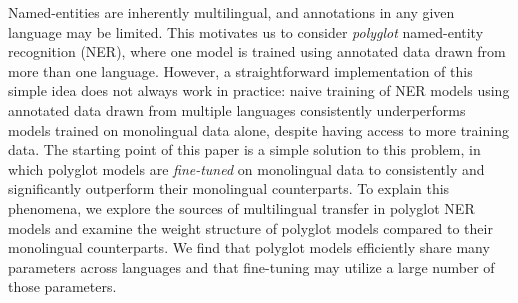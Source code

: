 Named-entities are inherently multilingual, and annotations in any given language may be limited. This motivates us to consider \emph{polyglot} named-entity recognition (NER), where one model is trained using annotated data drawn from more than one language. However, a straightforward implementation of this simple idea does not always work in practice: naive training of NER models using annotated data drawn from multiple languages consistently underperforms models trained on monolingual data alone, despite having access to more training data. The starting point of this paper is a simple solution to this problem, in which polyglot models are \emph{fine-tuned} on monolingual data to consistently and significantly outperform their monolingual counterparts. To explain this phenomena, we explore the sources of multilingual transfer in polyglot NER models and examine the weight structure of polyglot models compared to their monolingual counterparts. We find that polyglot models efficiently share many parameters across languages and that fine-tuning may utilize a large number of those parameters.
